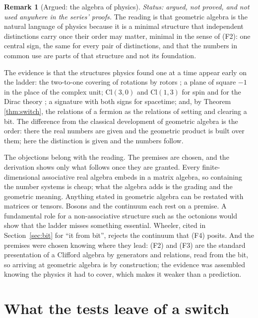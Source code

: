 \documentclass[11pt]{article}
\theoremstyle{plain}
\theoremstyle{definition}
\theoremstyle{plain}
\theoremstyle{definition}
\newtheorem{remark}[theorem]{Remark}
\newcommand{\Cl}{\mathrm{Cl}}
\begin{document}
\begin{remark}[Argued: the algebra of physics]\label{rem:argued}
\emph{Status: argued, not proved, and not used anywhere in the series' proofs.} The reading is that geometric algebra is the natural language of physics because it is a minimal structure that independent distinctions carry once their order may matter, minimal in the sense of (F2): one central sign, the same for every pair of distinctions, and that the numbers in common use are parts of that structure and not its foundation.

The evidence is that the structures physics found one at a time appear early on the ladder: the two-to-one covering of rotations by rotors \cite[Example 6.1]{ButlerT0}; a plane of square $-1$ in the place of the complex unit; $\Cl(3,0)$ and $\Cl(1,3)$ for spin and for the Dirac theory \cite{Hestenes1966, Hestenes2003}; a signature with both signs for spacetime; and, by Theorem \ref{thm:switch}, the relations of a fermion as the relations of setting and clearing a bit. The difference from the classical development of geometric algebra \cite{HestenesSobczyk1984} is the order: there the real numbers are given and the geometric product is built over them; here the distinction is given and the numbers follow.

The objections belong with the reading. The premises are chosen, and the derivation shows only what follows once they are granted. Every finite-dimensional associative real algebra embeds in a matrix algebra, so containing the number systems is cheap; what the algebra adds is the grading and the geometric meaning. Anything stated in geometric algebra can be restated with matrices or tensors. Bosons and the continuum each rest on a premise. A fundamental role for a non-associative structure such as the octonions would show that the ladder misses something essential. Wheeler, cited in Section~\ref{sec:bit} for ``it from bit'', rejects the continuum that (F4) posits. And the premises were chosen knowing where they lead: (F2) and (F3) are the standard presentation of a Clifford algebra by generators and relations, read from the bit, so arriving at geometric algebra is by construction; the evidence was assembled knowing the physics it had to cover, which makes it weaker than a prediction.
\end{remark}

\section{What the tests leave of a switch}\label{sec:tests}
\end{document}
